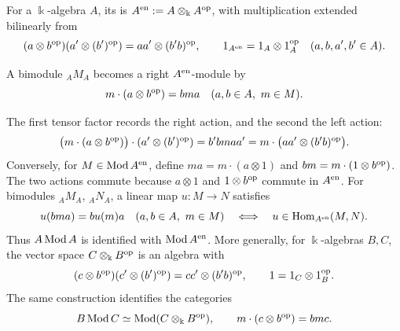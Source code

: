 \begin{definition}\label{def:enveloping-algebra}
For a $\Bbbk$-algebra $A$, its  is $A^{\mathrm{en}}:=A\otimes_\Bbbk A^{\mathrm{op}}$, with multiplication extended bilinearly from
\[
(a\otimes b^{\mathrm{op}})(a'\otimes(b')^{\mathrm{op}})=aa'\otimes(b'b)^{\mathrm{op}},
\qquad 1_{A^{\mathrm{en}}}=1_A\otimes1_A^{\mathrm{op}}
\quad(a,b,a',b'\in A).
\]
\end{definition}

A bimodule ${}_AM_A$ becomes a right $A^{\mathrm{en}}$-module by
\begin{equation}\label{eq:enveloping-action}
m\cdot(a\otimes b^{\mathrm{op}})=bma
\quad(a,b\in A,\ m\in M).
\end{equation}
\begin{supplementary}
The first tensor factor records the right action, and the second the left action:
\[
\bigl(m\cdot(a\otimes b^{\mathrm{op}})\bigr)\cdot(a'\otimes(b')^{\mathrm{op}})
=b'bmaa'
=m\cdot\bigl(aa'\otimes(b'b)^{\mathrm{op}}\bigr).
\]
Conversely, for $M\in\operatorname{\mathrm{Mod}} A^{\mathrm{en}}$, define $ma=m\cdot(a\otimes1)$ and $bm=m\cdot(1\otimes b^{\mathrm{op}})$.
The two actions commute because $a\otimes1$ and $1\otimes b^{\mathrm{op}}$ commute in $A^{\mathrm{en}}$.
For bimodules ${}_AM_A$, ${}_AN_A$, a linear map $u:M\to N$ satisfies
\[
u(bma)=bu(m)a\quad(a,b\in A,\ m\in M)
\quad\Longleftrightarrow\quad
u\in\Hom_{A^\en}(M,N).
\]
Thus $A\operatorname{\mathrm{Mod}} A$ is identified with $\operatorname{\mathrm{Mod}} A^{\mathrm{en}}$.
More generally, for $\Bbbk$-algebras $B,C$, the vector space $C\otimes_\Bbbk B^{\mathrm{op}}$ is an algebra with
\[
(c\otimes b^{\mathrm{op}})(c'\otimes(b')^{\mathrm{op}})=cc'\otimes(b'b)^{\mathrm{op}},
\qquad 1=1_C\otimes1_B^{\mathrm{op}}.
\]
The same construction identifies the categories
\[
B\operatorname{\mathrm{Mod}} C\simeq\operatorname{\mathrm{Mod}}(C\otimes_\Bbbk B^{\mathrm{op}}),
\qquad m\cdot(c\otimes b^{\mathrm{op}})=bmc.
\]
\end{supplementary}

